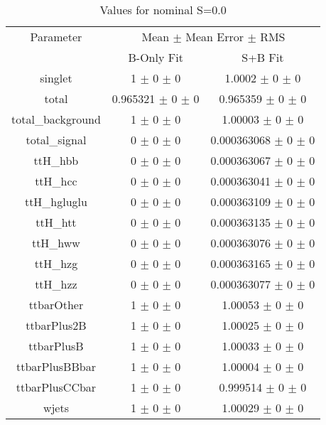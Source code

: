 \begin{table}
\centering
\caption{Values for nominal S=0.0}
\begin{tabular}{ccc}
\toprule
Parameter 	& \multicolumn{2}{c}{Mean $\pm$ Mean Error $\pm$ RMS}\\
 	& B-Only Fit & S+B Fit\\
\midrule
singlet 	& \num{1} $\pm$ \num{0} $\pm$ \num{0} 	& \num{1.0002} $\pm$ \num{0} $\pm$ \num{0}\\
total 	& \num{0.965321} $\pm$ \num{0} $\pm$ \num{0} 	& \num{0.965359} $\pm$ \num{0} $\pm$ \num{0}\\
total\_background 	& \num{1} $\pm$ \num{0} $\pm$ \num{0} 	& \num{1.00003} $\pm$ \num{0} $\pm$ \num{0}\\
total\_signal 	& \num{0} $\pm$ \num{0} $\pm$ \num{0} 	& \num{0.000363068} $\pm$ \num{0} $\pm$ \num{0}\\
ttH\_hbb 	& \num{0} $\pm$ \num{0} $\pm$ \num{0} 	& \num{0.000363067} $\pm$ \num{0} $\pm$ \num{0}\\
ttH\_hcc 	& \num{0} $\pm$ \num{0} $\pm$ \num{0} 	& \num{0.000363041} $\pm$ \num{0} $\pm$ \num{0}\\
ttH\_hgluglu 	& \num{0} $\pm$ \num{0} $\pm$ \num{0} 	& \num{0.000363109} $\pm$ \num{0} $\pm$ \num{0}\\
ttH\_htt 	& \num{0} $\pm$ \num{0} $\pm$ \num{0} 	& \num{0.000363135} $\pm$ \num{0} $\pm$ \num{0}\\
ttH\_hww 	& \num{0} $\pm$ \num{0} $\pm$ \num{0} 	& \num{0.000363076} $\pm$ \num{0} $\pm$ \num{0}\\
ttH\_hzg 	& \num{0} $\pm$ \num{0} $\pm$ \num{0} 	& \num{0.000363165} $\pm$ \num{0} $\pm$ \num{0}\\
ttH\_hzz 	& \num{0} $\pm$ \num{0} $\pm$ \num{0} 	& \num{0.000363077} $\pm$ \num{0} $\pm$ \num{0}\\
ttbarOther 	& \num{1} $\pm$ \num{0} $\pm$ \num{0} 	& \num{1.00053} $\pm$ \num{0} $\pm$ \num{0}\\
ttbarPlus2B 	& \num{1} $\pm$ \num{0} $\pm$ \num{0} 	& \num{1.00025} $\pm$ \num{0} $\pm$ \num{0}\\
ttbarPlusB 	& \num{1} $\pm$ \num{0} $\pm$ \num{0} 	& \num{1.00033} $\pm$ \num{0} $\pm$ \num{0}\\
ttbarPlusBBbar 	& \num{1} $\pm$ \num{0} $\pm$ \num{0} 	& \num{1.00004} $\pm$ \num{0} $\pm$ \num{0}\\
ttbarPlusCCbar 	& \num{1} $\pm$ \num{0} $\pm$ \num{0} 	& \num{0.999514} $\pm$ \num{0} $\pm$ \num{0}\\
wjets 	& \num{1} $\pm$ \num{0} $\pm$ \num{0} 	& \num{1.00029} $\pm$ \num{0} $\pm$ \num{0}\\
\bottomrule
\end{tabular}
\end{table}